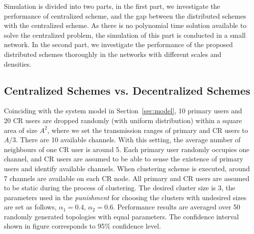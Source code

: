 \documentclass[journal,comsoc]{IEEEtran}
\theoremstyle{mytheoremstyle}
\theoremstyle{mytheoremstyle}
\theoremstyle{mytheoremstyle}
\begin{document}
Simulation is divided into two parts, in the first part, we investigate the performance of centralized scheme, and the gap between the distributed schemes with the centralized scheme.
As there is no polynomial time solution available to solve the centralized problem, the simulation of this part is conducted in a small network.
In the second part, we investigate the performance of the proposed distributed schemes thoroughly in the networks with different scales and densities.
\subsection{Centralized Schemes vs. Decentralized Schemes}
Coinciding with the system model in Section~\ref{sec:model}, 10 primary users and 20 CR users are dropped randomly (with uniform distribution) within a square area of size $A^{2}$, where we set the transmission ranges of primary and CR users to $A/3$.
There are 10 available channels. 
With this setting, the average number of neighbours of one CR user is around 5.
Each primary user randomly occupies one channel, and CR users are assumed to be able to sense the existence of primary users and identify available channels.
When clustering scheme is executed, around 7 channels are available on each CR node.
All primary and CR users are assumed to be static during the process of clustering.
The desired cluster size is 3, the parameters used in the \textit{punishment} for choosing the clusters with undesired sizes are set as follows, $\alpha_1 =  0.4$, $\alpha_2 =  0.6$.
Performance results are averaged over 50 randomly generated topologies with equal parameters.
The confidence interval shown in figure corresponds to 95\% confidence level.
\end{document}
